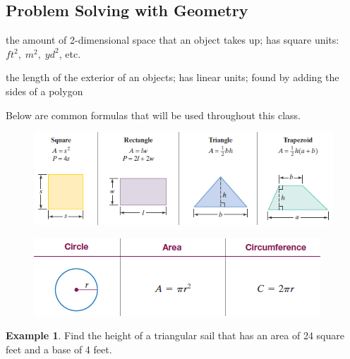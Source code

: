 \documentclass[addpoints,12pt]{exam}
\theoremstyle{definition}
\theoremstyle{break}
\theoremstyle{break}
\newtheorem{example}{Example}[subsection]
\begin{document}
\setcounter{section}{2}
\setcounter{subsection}{5}

\subsection{Problem Solving with Geometry}

\vspace{.25in}

\begin{definition}[Area]
the amount of 2-dimensional space that an object takes up; has square units: $ft^2,\; m^2,\; yd^2$, etc.
\end{definition}

\vspace{.15in}

\begin{definition}[Perimeter]
the length of the exterior of an objects; has linear units; found by adding the sides of a polygon
\end{definition}

\vspace{.15in}

\noindent Below are common formulas that will be used throughout this class.
\begin{figure}[h]
\centering
\includegraphics[scale=1]{../images/polygon_formulas}
\end{figure}
\begin{figure}[h]
\centering
\includegraphics[scale=1]{../images/circle_formulas}
\end{figure}

\newpage

\begin{example}
Find the height of a triangular sail that has an area of 24 square feet and a base of 4 feet.
\vspace{2.5in}
\end{example}
\end{document}
